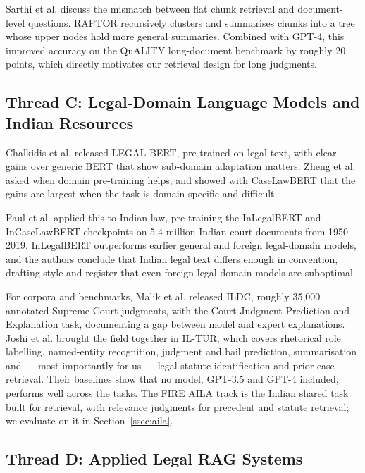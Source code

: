 \documentclass[conference]{IEEEtran}
\begin{document}
Sarthi et al. \cite{sarthi2024} discuss the mismatch between flat chunk retrieval and document-level questions. RAPTOR recursively clusters and summarises chunks into a tree whose upper nodes hold more general summaries. Combined with GPT-4, this improved accuracy on the QuALITY long-document benchmark by roughly 20 points, which directly motivates our retrieval design for long judgments.

\subsection{Thread C: Legal-Domain Language Models and Indian Resources}

Chalkidis et al. \cite{chalkidis2020} released LEGAL-BERT, pre-trained on legal text, with clear gains over generic BERT that show sub-domain adaptation matters. Zheng et al. \cite{zheng2021} asked when domain pre-training helps, and showed with CaseLawBERT that the gains are largest when the task is domain-specific and difficult.

Paul et al. \cite{paul2023} applied this to Indian law, pre-training the InLegalBERT and InCaseLawBERT checkpoints on 5.4 million Indian court documents from 1950--2019. InLegalBERT outperforms earlier general and foreign legal-domain models, and the authors conclude that Indian legal text differs enough in convention, drafting style and register that even foreign legal-domain models are suboptimal.

For corpora and benchmarks, Malik et al. \cite{malik2021} released ILDC, roughly 35,000 annotated Supreme Court judgments, with the Court Judgment Prediction and Explanation task, documenting a gap between model and expert explanations. Joshi et al. \cite{joshi2024} brought the field together in IL-TUR, which covers rhetorical role labelling, named-entity recognition, judgment and bail prediction, summarisation and --- most importantly for us --- legal statute identification and prior case retrieval. Their baselines show that no model, GPT-3.5 and GPT-4 included, performs well across the tasks. The FIRE AILA track \cite{bhattacharya2019} is the Indian shared task built for retrieval, with relevance judgments for precedent and statute retrieval; we evaluate on it in Section~\ref{ssec:aila}.

\subsection{Thread D: Applied Legal RAG Systems}
\end{document}
